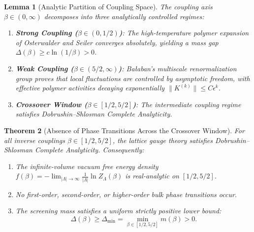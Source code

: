 \documentclass[11pt,reqno]{amsart}
\theoremstyle{plain}
\newtheorem{theorem}{Theorem}[section]
\newtheorem{lemma}[theorem]{Lemma}
\theoremstyle{definition}
\theoremstyle{remark}
\numberwithin{equation}{section}
\begin{document}
\begin{lemma}[Analytic Partition of Coupling Space]
\label{lem:three_regimes}
The coupling axis $\beta \in (0, \infty)$ decomposes into three analytically controlled regimes:
\begin{enumerate}
    \item \textbf{Strong Coupling ($\beta \in (0, 1/2)$)}: The high-temperature polymer expansion of Osterwalder and Seiler \cite{OsterwalderSeiler1978} converges absolutely, yielding a mass gap $\Delta(\beta) \ge c \ln(1/\beta) > 0$.
    \item \textbf{Weak Coupling ($\beta \in (5/2, \infty)$)}: Ba{\l}aban's multiscale renormalization group \cite{Balaban1984, Balaban1985} proves that local fluctuations are controlled by asymptotic freedom, with effective polymer activities decaying exponentially $\|K^{(k)}\| \le C \epsilon^k$.
    \item \textbf{Crossover Window ($\beta \in [1/2, 5/2]$)}: The intermediate coupling regime satisfies Dobrushin--Shlosman Complete Analyticity.
\end{enumerate}
\end{lemma}

\begin{theorem}[Absence of Phase Transitions Across the Crossover Window]
\label{thm:crossover_dsca}
For all inverse couplings $\beta \in [1/2, 5/2]$, the lattice gauge theory satisfies Dobrushin--Shlosman Complete Analyticity. Consequently:
\begin{enumerate}
    \item The infinite-volume vacuum free energy density $f(\beta) = -\lim_{|\Lambda|\to\infty} \frac{1}{|\Lambda|} \ln Z_\Lambda(\beta)$ is real-analytic on $[1/2, 5/2]$.
    \item No first-order, second-order, or higher-order bulk phase transitions occur.
    \item The screening mass satisfies a uniform strictly positive lower bound:
    \begin{equation}
    \Delta(\beta) \ge \Delta_{\min} = \min_{\beta \in [1/2, 5/2]} m(\beta) > 0.
    \end{equation}
\end{enumerate}
\end{theorem}
\end{document}
